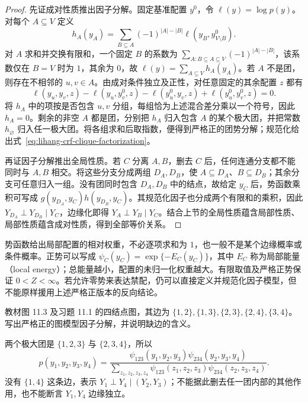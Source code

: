 \begin{proof}
先证成对性质推出因子分解。固定基准配置 $y^0$，令 $\ell(y)=\log p(y)$。对每个 $A\subseteq V$ 定义
\[
  h_A(y_A)=\sum_{B\subseteq A}(-1)^{|A|-|B|}
      \ell(y_B,y^0_{V\setminus B}).
\]
对 $A$ 求和并交换有限和，一个固定 $B$ 的系数为 $\sum_{A:B\subseteq A\subseteq V}(-1)^{|A|-|B|}$，该系数仅在 $B=V$ 时为 $1$，其余为 $0$，故 $\ell(y)=\sum_{A\subseteq V}h_A(y_A)$。若 $A$ 不是团，则存在不相邻的 $u,v\in A$。由成对条件独立及正性，对任意固定的其余配置 $z$ 都有
\[
  \ell(y_u,y_v,z)-\ell(y_u,y_v^0,z)
  -\ell(y_u^0,y_v,z)+\ell(y_u^0,y_v^0,z)=0.
\]
将 $h_A$ 中的项按是否包含 $u,v$ 分组，每组恰为上述混合差分乘以一个符号，因此 $h_A=0$。剩余的非空 $A$ 都是团，分别把 $h_A$ 归入包含 $A$ 的某个极大团，并把常数 $h_\varnothing$ 归入任一极大团。将各组求和后取指数，便得到严格正的团势分解；规范化给出式~\eqref{eq:lihang-crf-clique-factorization}。

再证因子分解推出全局性质。若 $C$ 分离 $A,B$，删去 $C$ 后，任何连通分支都不能同时与 $A,B$ 相交。将这些分支分成两组 $D_A,D_B$，使 $A\subseteq D_A$、$B\subseteq D_B$；其余分支可任意归入一组。没有团同时包含 $D_A,D_B$ 中的结点，故给定 $y_C$ 后，势函数乘积可写成 $g(y_{D_A},y_C)h(y_{D_B},y_C)$。其规范化因子也分成两个有限和的乘积，因此 $Y_{D_A}\perp Y_{D_B}\mid Y_C$，边缘化即得 $Y_A\perp Y_B\mid Y_C$。结合上节的全局性质蕴含局部性质、局部性质蕴含成对性质，得到全部等价关系。
\end{proof}

势函数给出局部配置的相对权重，不必逐项求和为 $1$，也一般不是某个边缘概率或条件概率。正势可以写成 $\psi_C(y_C)=\exp\{-E_C(y_C)\}$，其中 $E_C$ 称为局部能量（local energy）；总能量越小，配置的未归一化权重越大。有限取值及严格正势保证 $0<Z<\infty$。若允许零势来表达禁配，仍可以直接定义并规范化因子模型，但不能原样援用上述严格正版本的反向结论。

\begin{example}
\label{ex:lihang-crf-four-node-cliques}
教材图 11.3 及习题 11.1 的四结点图，其边为 $\{1,2\},\{1,3\},\{2,3\},\{2,4\},\{3,4\}$。写出严格正的图模型因子分解，并说明缺边的含义。
\end{example}
\begin{solve}
两个极大团是 $\{1,2,3\}$ 与 $\{2,3,4\}$，所以
\[
  p(y_1,y_2,y_3,y_4)
  =\frac{\psi_{123}(y_1,y_2,y_3)\psi_{234}(y_2,y_3,y_4)}
  {\displaystyle\sum_{z_1,z_2,z_3,z_4}
       \psi_{123}(z_1,z_2,z_3)\psi_{234}(z_2,z_3,z_4)}.
\]
没有 $\{1,4\}$ 这条边，表示 $Y_1\perp Y_4\mid(Y_2,Y_3)$；不能据此删去任一团内部的其他作用，也不能断言 $Y_1,Y_4$ 边缘独立。
\end{solve}

